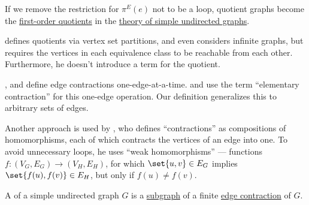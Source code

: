 \begin{comments}
  \item If we remove the restriction for \( \pi^E(e) \) not to be a loop, quotient graphs become the \hyperref[def:first_order_quotient]{first-order quotients} in the \hyperref[rem:theory_of_simple_undirected_graphs]{theory of simple undirected graphs}.

  \item {} defines quotients via vertex set partitions, and even considers infinite graphs, but requires the vertices in each equivalence class to be reachable from each other. Furthermore, he doesn't introduce a term for the quotient.

  \item {},  and  define edge contractions one-edge-at-a-time.  and  use the term \enquote{elementary contraction} for this one-edge operation. Our definition generalizes this to arbitrary sets of edges.

  \item Another approach is used by , who defines \enquote{contractions} as compositions of homomorphisms, each of which contracts the vertices of an edge into one. To avoid unnecessary loops, he uses \enquote{weak homomorphisms} --- functions \( f: (V_G, E_G) \to (V_H, E_H) \), for which \( \set{ u, v } \in E_G \) implies \( \set{ f(u), f(v) } \in E_H \), but only if \( f(u) \neq f(v) \).
\end{comments}

\begin{definition}\label{def:graph_minor}
  A  of a simple undirected graph \( G \) is a \hyperref[def:undirected_graph/subgraph]{subgraph} of a finite \hyperref[def:quotient_graph/edge]{edge contraction} of \( G \).
\end{definition}
